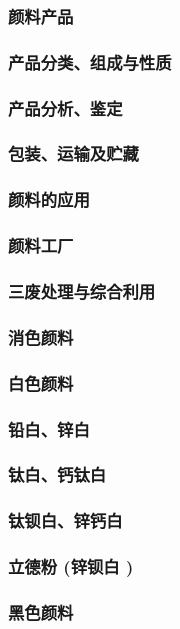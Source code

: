 \documentclass[UTF8]{../../ApplicationUniverse}
\begin{document}
    \subsubsection{颜料产品}
        \subsubsection{产品分类、组成与性质}
        \subsubsection{产品分析、鉴定}
        \subsubsection{包装、运输及贮藏}
        \subsubsection{颜料的应用}
    \subsubsection{颜料工厂}
    \subsubsection{三废处理与综合利用}
\subsubsection{消色颜料}
    \subsubsection{白色颜料}
        \subsubsection{铅白、锌白}
        \subsubsection{钛白、钙钛白}
        \subsubsection{钛钡白、锌钙白}
        \subsubsection{立德粉 (锌钡白 )}
    \subsubsection{黑色颜料}
\end{document}

